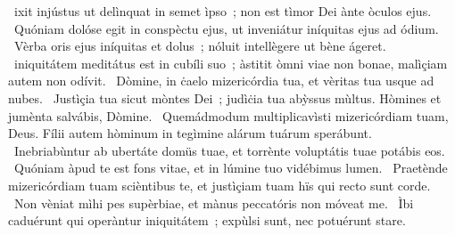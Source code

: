 { }
{%
~ixit injústus ut delìnquat in semet ìpso~; non est tìmor Dei ànte òculos ejus. 
~Quóniam dolóse egit in conspèctu ejus, ut inveniátur iníquitas ejus ad ódium. 
~Vèrba oris ejus iníquitas et dolus~; nóluit intellègere ut bène ágeret. 
~iniquitátem meditátus est in cubíli suo~; àstitit òmni viae non bonae, malìçiam autem non odívit. 
~Dòmine, in ċaelo mizericórdia tua, et vèritas tua usque ad nubes. 
~Justìçia tua sicut mòntes Dei~; judìċia tua abỳssus mùltus. Hòmines et jumènta salvábis, Dòmine. 
~Quemádmodum multiplicavìsti mizericórdiam tuam, Deus. Fílii autem hòminum in tegìmine alárum tuárum sperábunt. 
~Inebriabùntur ab ubertáte domüs tuae, et torrènte voluptátis tuae potábis eos. 
~Quóniam àpud te est fons vitae, et in lúmine tuo vidébimus lumen. 
~Praetènde mizericórdiam tuam scièntibus te, et justìçiam tuam hïs qui recto sunt corde. 
~Non vèniat mìhi pes supèrbiae, et mànus peccatóris non móveat me. 
~Ìbi caduérunt qui operàntur iniquitátem~; expùlsi sunt, nec potuérunt stare. 
}
